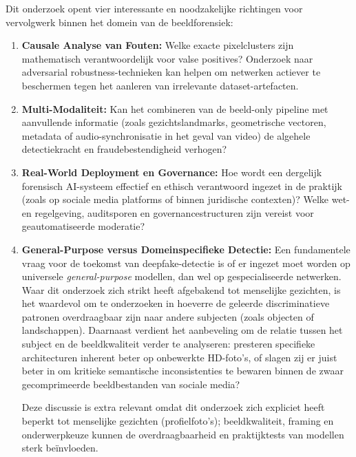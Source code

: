 Dit onderzoek opent vier interessante en noodzakelijke richtingen voor vervolgwerk binnen het domein van de beeldforensiek:

\begin{enumerate}
    \item \textbf{Causale Analyse van Fouten:} Welke exacte pixelclusters zijn mathematisch verantwoordelijk voor valse positives? Onderzoek naar adversarial robustness-technieken kan helpen om netwerken actiever te beschermen tegen het aanleren van irrelevante dataset-artefacten.
    
    \item \textbf{Multi-Modaliteit:} Kan het combineren van de beeld-only pipeline met aanvullende informatie (zoals gezichtslandmarks, geometrische vectoren, metadata of audio-synchronisatie in het geval van video) de algehele detectiekracht en fraudebestendigheid verhogen?
    
    \item \textbf{Real-World Deployment en Governance:} Hoe wordt een dergelijk forensisch AI-systeem effectief en ethisch verantwoord ingezet in de praktijk (zoals op sociale media platforms of binnen juridische contexten)? Welke wet- en regelgeving, auditsporen en governancestructuren zijn vereist voor geautomatiseerde moderatie?
    
    \item \textbf{General-Purpose versus Domeinspecifieke Detectie:} Een fundamentele vraag voor de toekomst van deepfake-detectie is of er ingezet moet worden op universele \emph{general-purpose} modellen, dan wel op gespecialiseerde netwerken. Waar dit onderzoek zich strikt heeft afgebakend tot menselijke gezichten, is het waardevol om te onderzoeken in hoeverre de geleerde discriminatieve patronen overdraagbaar zijn naar andere subjecten (zoals objecten of landschappen). Daarnaast verdient het aanbeveling om de relatie tussen het subject en de beeldkwaliteit verder te analyseren: presteren specifieke architecturen inherent beter op onbewerkte HD-foto's, of slagen zij er juist beter in om kritieke semantische inconsistenties te bewaren binnen de zwaar gecomprimeerde beeldbestanden van sociale media?
    
    Deze discussie is extra relevant omdat dit onderzoek zich expliciet heeft beperkt tot menselijke gezichten (profielfoto's); beeldkwaliteit, framing en onderwerpkeuze kunnen de overdraagbaarheid en praktijktests van modellen sterk beïnvloeden.
\end{enumerate}

